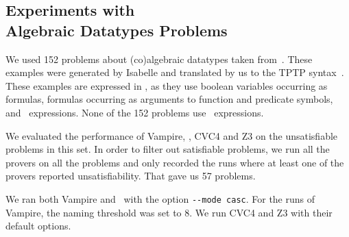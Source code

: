 %
%

\subsection[Experiments with Algebraic Datatypes Problems]{Experiments with\\Algebraic Datatypes Problems}\label{subsec:ADT}
We used 152 problems about (co)algebraic datatypes taken from~\cite{Blanchette15}. 
These examples were generated by Isabelle and translated by us to the TPTP syntax~\cite{TPTP}. 
These examples are expressed in \folb{}, as they use boolean variables occurring as formulas, formulas occurring as arguments to function and predicate symbols, and \ITE\ expressions. None of the 152 problems use \LETIN\ expressions.

We evaluated the performance of Vampire, \oldcnfVampire,
CVC4 and Z3 on the unsatisfiable problems in this set. In order to filter out satisfiable problems, we run all the provers on all the problems 
and only recorded the runs where at least one of the provers reported unsatisfiability. That gave us 57 problems.

We ran both Vampire and \oldcnfVampire\ with the option \verb'--mode casc'. For the runs of Vampire, the naming threshold was set to 8. We run CVC4 and Z3 with their default options.

